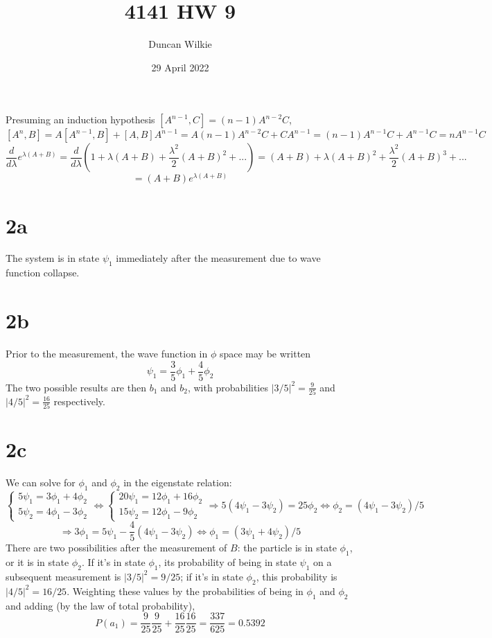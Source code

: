 \documentclass{article}
\title{4141 HW 9}
\author{Duncan Wilkie}
\date{29 April 2022}
\begin{document}
\maketitle

\section{}
Presuming an induction hypothesis $[A^{n-1},C]=(n-1)A^{n-2}C$,
\[
  [A^{n},B]=A[A^{n-1},B]+ [A,B]A^{n-1}
  =A(n-1)A^{n-2}C+CA^{n-1}
  =(n-1)A^{n-1}C+A^{n-1}C
  =nA^{n-1}C
\]
\[
  \frac{d}{d\lambda}e^{\lambda (A+B)}=\frac{d}{d\lambda}\left(  1+\lambda(A+B)+\frac{\lambda^{2}}{2}(A+B)^{2}+...\right)
  =(A+B)+\lambda (A+B)^{2}+\frac{\lambda^{2}}{2}(A+B)^{3}+...
\]
\[
  =(A+B)e^{\lambda(A+B)}
\]
\section*{2a}
The system is in state $\psi_{1}$ immediately after the measurement due to wave function collapse.
\section*{2b}
Prior to the measurement, the wave function in $\phi$ space may be written
\[
  \psi_{1}=\frac{3}{5}\phi_{1}+\frac{4}{5}\phi_{2}
\]
The two possible results are then $b_{1}$ and $b_{2}$, with probabilities $|3/5|^{2}=\frac{9}{25}$ and $|4/5|^{2}=\frac{16}{25}$
respectively.

\section*{2c}
We can solve for $\phi_{1}$ and $\phi_{2}$ in the eigenstate relation:
\[
  \begin{cases}
    5\psi_{1}=3\phi_{1}+4\phi_{2} \\
    5\psi_{2}=4\phi_{1}-3\phi_{2}
  \end{cases}
  \Leftrightarrow
  \begin{cases}
    20\psi_{1}=12\phi_{1}+16\phi_{2} \\
    15\psi_{2}=12\phi_{1}-9\phi_{2}
  \end{cases}
  \Rightarrow
  5(4\psi_{1}-3\psi_{2})=25\phi_{2}
  \Leftrightarrow
  \phi_{2}=(4\psi_{1}-3\psi_{2})/5
\]
\[
  \Rightarrow
  3\phi_{1}=5\psi_{1}-\frac{4}{5}(4\psi_{1}-3\psi_{2})
  \Leftrightarrow
  \phi_{1}=({3}\psi_{1}+{4}\psi_{2})/5
\]
There are two possibilities after the measurement of $B$: the particle is in state $\phi_{1}$, or it is in state $\phi_{2}$.
If it's in state $\phi_{1}$, its probability of being in state $\psi_{1}$ on a subsequent measurement is $|3/5|^{2}=9/25$;
if it's in state $\phi_{2}$, this probability is $|4/5|^{2}=16/25$.
Weighting these values by the probabilities of being in $\phi_{1}$ and $\phi_{2}$ and adding (by the law of total probability),
\[P(a_{1})=\frac{9}{25}\frac{9}{25}+\frac{16}{25}\frac{16}{25}=\frac{337}{625}=0.5392\]
\end{document}
